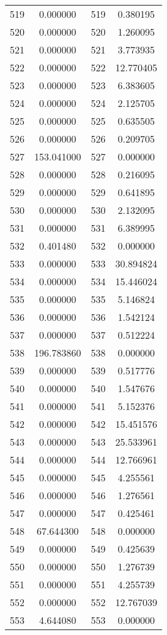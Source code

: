 \documentclass[12pt]{article}
\begin{document}
\begin{longtable}{@{}cccc@{}}
519 & 0.000000 & 519 & 0.380195 \\
520 & 0.000000 & 520 & 1.260095 \\
521 & 0.000000 & 521 & 3.773935 \\
522 & 0.000000 & 522 & 12.770405 \\
523 & 0.000000 & 523 & 6.383605 \\
524 & 0.000000 & 524 & 2.125705 \\
525 & 0.000000 & 525 & 0.635505 \\
526 & 0.000000 & 526 & 0.209705 \\
527 & 153.041000 & 527 & 0.000000 \\
528 & 0.000000 & 528 & 0.216095 \\
529 & 0.000000 & 529 & 0.641895 \\
530 & 0.000000 & 530 & 2.132095 \\
531 & 0.000000 & 531 & 6.389995 \\
532 & 0.401480 & 532 & 0.000000 \\
533 & 0.000000 & 533 & 30.894824 \\
534 & 0.000000 & 534 & 15.446024 \\
535 & 0.000000 & 535 & 5.146824 \\
536 & 0.000000 & 536 & 1.542124 \\
537 & 0.000000 & 537 & 0.512224 \\
538 & 196.783860 & 538 & 0.000000 \\
539 & 0.000000 & 539 & 0.517776 \\
540 & 0.000000 & 540 & 1.547676 \\
541 & 0.000000 & 541 & 5.152376 \\
542 & 0.000000 & 542 & 15.451576 \\
543 & 0.000000 & 543 & 25.533961 \\
544 & 0.000000 & 544 & 12.766961 \\
545 & 0.000000 & 545 & 4.255561 \\
546 & 0.000000 & 546 & 1.276561 \\
547 & 0.000000 & 547 & 0.425461 \\
548 & 67.644300 & 548 & 0.000000 \\
549 & 0.000000 & 549 & 0.425639 \\
550 & 0.000000 & 550 & 1.276739 \\
551 & 0.000000 & 551 & 4.255739 \\
552 & 0.000000 & 552 & 12.767039 \\
553 & 4.644080 & 553 & 0.000000 \\

\end{longtable}
\end{document}
